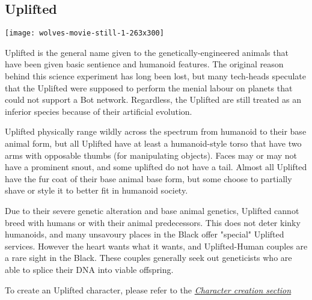 \subsection{Uplifted}
\label{sec:specie-uplifted}

\texttt{[image: wolves-movie-still-1-263x300]}

Uplifted is the general name given to the genetically-engineered animals that have been given basic sentience and humanoid features. The original reason behind this science experiment has long been lost, but many tech-heads speculate that the Uplifted were supposed to perform the menial labour on planets that could not support a Bot network. Regardless, the Uplifted are still treated as an inferior species because of their artificial evolution.

Uplifted physically range wildly across the spectrum from humanoid to their base animal form, but all Uplifted have at least a humanoid-style torso that have two arms with opposable thumbs (for manipulating objects). Faces may or may not have a prominent snout, and some uplifted do not have a tail. Almost all Uplifted have the fur coat of their base animal base form, but some choose to partially shave or style it to better fit in humanoid society.

Due to their severe genetic alteration and base animal genetics, Uplifted cannot breed with humans or with their animal predecessors. This does not deter kinky humanoids, and many unsavoury places in the Black offer "special" Uplifted services. However the heart wants what it wants, and Uplifted-Human couples are a rare sight in the Black. These couples generally seek out geneticists who are able to splice their DNA into viable offspring.

To create an Uplifted character, please refer to the \textit{\hyperref[sec:rules-creation]{Character creation section}}
